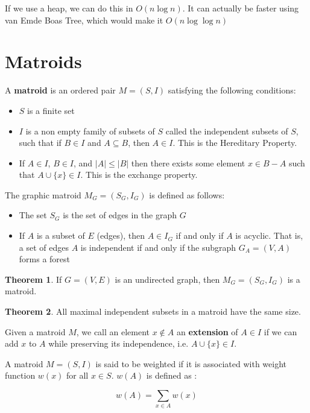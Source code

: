\documentclass[12pt,letterpaper]{article}
\theoremstyle{definition}
\newtheorem{theorem}{Theorem}[section] %
\begin{document}
If we use a heap, we can do this in $O(n \log n)$. It can actually be faster using van Emde Boas Tree, which would make it $O(n \log \log n)$

\section{Matroids}

A \textbf{matroid}  is an ordered pair $M = (S,I)$ satisfying the following conditions:

\begin{itemize}
  \item $S$ is a finite set
  \item $I$ is a non empty family of subsets of $S$ called the independent subsets of $S$, such that if $B \in I$ and $A \subseteq B$, then $A \in I$. This is the Hereditary Property.
  \item If $A \in I$, $B \in I$, and $|A| \leq |B|$ then there exists some element $x\in B-A$ such that $A \cup \{x\} \in I$. This is the exchange property.
\end{itemize}

The graphic matroid $M_G = (S_G, I_G)$ is defined as follows:

\begin{itemize}
  \item The set $S_G$ is the set of edges in the graph $G$
  \item If $A$ is a subset of $E$ (edges), then $A \in I_G$ if and only if $A$ is acyclic. That is, a set of edges $A$ is independent if and only if the subgraph $G_A = (V,A)$ forms a forest
\end{itemize}

\begin{theorem}
  If $G = (V,E)$ is an undirected graph, then $M_G = (S_G,I_G)$ is a matroid.
\end{theorem}

\begin{theorem}
  All maximal independent subsets in a matroid have the same size.
\end{theorem}

Given a matroid $M$, we call an element $x \notin A$ an \textbf{extension} of $A \in I$ if we can add $x$ to $A$ while preserving its independence, i.e. $A \cup \{x\} \in I$. 

A matroid $M = (S,I)$ is said to be weighted if it is associated with weight function $w(x)$ for all $x \in S$. $w(A)$ is defined as :

\[w(A) = \sum_{x \in A} w(x)\]
\end{document}
